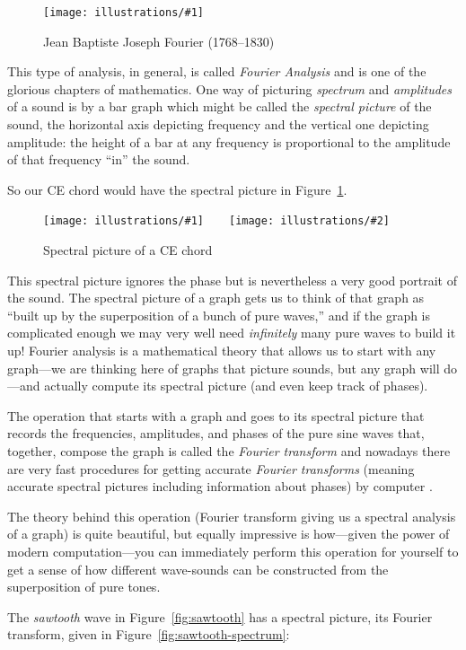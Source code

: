 \documentclass[openany]{book}
\newcommand{\ill}[3]{%
   \begin{figure}[H]%
   \vspace{-2ex}
   \centering%
   \texttt{[image: illustrations/\#1]}%
   \caption{#3}%
   \vspace{-2ex}
    \end{figure}}
\newcommand{\illtwo}[4]{%
   \begin{figure}[H]\centering%
   \texttt{[image: illustrations/\#1]}$\qquad$\texttt{[image: illustrations/\#2]}%
   \caption{#4}%
    \end{figure}}
\theoremstyle{plain}
\theoremstyle{definition}
\begin{document}
{\ill{fourier}{0.3}{Jean Baptiste Joseph Fourier (1768--1830)}

This type of analysis, in general, is called {\em Fourier Analysis}
and is one of the glorious chapters of mathematics.  One way of
picturing {\em spectrum} and {\em amplitudes} of a sound is by a bar
graph which might be called the {\em spectral picture} of the sound,
the horizontal axis depicting frequency and the vertical one depicting
amplitude: the height of a bar at any frequency is proportional to the
amplitude of that frequency ``in'' the sound.

So our CE chord would have the spectral picture in
Figure~\ref{fig:ce-spectral}.


\illtwo{sound-ce-general_sum}{sound-ce-general_sum-blips}{.45}
       {Spectral picture of a CE chord\label{fig:ce-spectral}}


This spectral picture ignores the phase but is nevertheless a very
good portrait of the sound.  The spectral picture of a graph gets us
to think of that graph as ``built up by the superposition of a bunch
of pure waves,'' and if the graph is complicated enough we may very well
need {\em infinitely} many pure waves to build it up!  Fourier analysis is a
mathematical theory that allows us to start with any graph---we are
thinking here of graphs that picture sounds, but any graph will
do---and actually compute its spectral picture (and even keep track of
phases).


The operation that starts with a graph and goes to its spectral
picture that records the frequencies, amplitudes, and phases of the
pure sine waves that, together, compose the graph is called the {\em
  Fourier transform} and nowadays there are very fast procedures for
getting accurate {\em Fourier transforms} (meaning accurate spectral
pictures including information about phases) by
computer .


The theory behind this operation (Fourier transform giving
us a spectral analysis of a graph) is quite beautiful, but equally
impressive is how---given the power of modern computation---you can
immediately perform this operation for yourself to get a sense of how
different wave-sounds can be constructed from the superposition of
pure tones.

The {\em sawtooth} wave in Figure~\ref{fig:sawtooth} has a spectral picture, its Fourier transform, given in Figure~\ref{fig:sawtooth-spectrum}:

}
\end{document}
